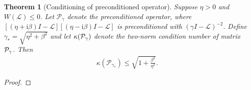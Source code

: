 \documentclass[a4paper,10pt]{article}
\newtheorem{theorem}{Theorem}
\begin{document}
\begin{theorem}[Conditioning of preconditioned operator]\label{th:cond_lin}
\label{th:conditioning_lin}
Suppose $\eta > 0$ and $W(\mathcal{L}) \leq 0$. Let $\mathcal{P}_\gamma$ denote
the preconditioned operator, where $[(\eta + \mathrm{i}\beta)I -
\mathcal{L}][(\eta - \mathrm{i}\beta)I - \mathcal{L}]$ is
preconditioned with $(\gamma I - \mathcal{L})^{-2}$.
Define $\gamma_* = \sqrt{\eta^2+\beta^2}$ and let $\kappa({\cal P}_{\gamma})$ denote the two-norm condition number of matrix ${\cal P}_{\gamma}$. Then
%
\begin{align} \label{eq:cond_P_gamma*_bnd}
\kappa(\mathcal{P}_{\gamma_*}) \leq \sqrt{1+\frac{\beta^2}{\eta^2}}.
\end{align}
\end{theorem}
\begin{proof}


\end{proof}
\end{document}
